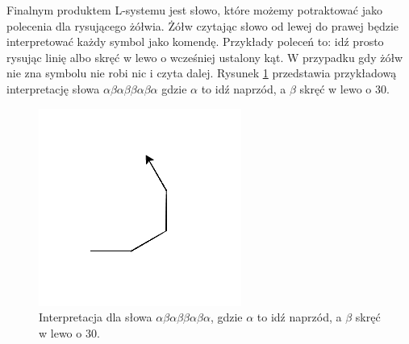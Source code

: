 \documentclass[inz,longabstract]{iithesis}
\begin{document}
            Finalnym produktem L-systemu jest słowo, które możemy potraktować jako polecenia dla rysującego żółwia. Żółw czytając słowo od lewej do prawej będzie interpretować każdy symbol jako komendę. Przykłady poleceń to: idź prosto rysując linię albo skręć w lewo o wcześniej ustalony kąt. W przypadku gdy żółw nie zna symbolu nie robi nic i czyta dalej. Rysunek \ref{fig:turtleExample} przedstawia przykładową interpretację słowa $\alpha\beta\alpha\beta\beta\alpha\beta\alpha$ gdzie $\alpha$ to idź naprzód, a $\beta$ skręć w lewo o 30\degree.
            \begin{figure}
                \includegraphics[width=\linewidth]{turtleExample.png}
                \caption{Interpretacja dla słowa $\alpha\beta\alpha\beta\beta\alpha\beta\alpha$, gdzie $\alpha$ to idź naprzód, a $\beta$ skręć w lewo o 30\degree.}
                \label{fig:turtleExample}
            \end{figure}
            
\end{document}

